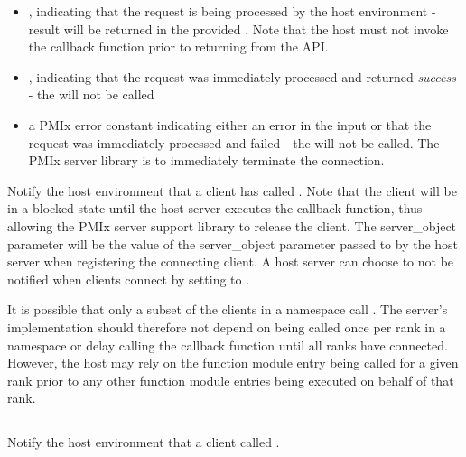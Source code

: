 \begin{itemize}
    \item {}, indicating that the request is being processed by the host environment - result will be returned in the provided . Note that the host must not invoke the callback function prior to returning from the \ac{API}.
    \item {}, indicating that the request was immediately processed and returned \textit{success} - the  will not be called
    \item a PMIx error constant indicating either an error in the input or that the request was immediately processed and failed - the  will not be called. The \ac{PMIx} server library is to immediately terminate the connection.
\end{itemize}

\descr

Notify the host environment that a client has called .
Note that the client will be in a blocked state until the host server executes the callback function, thus allowing the \ac{PMIx} server support library to release
the client.
The server_object parameter will be the value of the server_object parameter passed to
 by the host server when registering the connecting client. A host server can choose to not be notified when clients connect by setting  to .

It is possible that only a subset of the clients in a namespace call
.   The server's 
implementation should therefore not depend on being called once per rank in a
namespace or delay calling the callback function until all ranks have
connected. However, the host may rely on the
function module entry being called for a given rank prior to any other function
module entries being executed on behalf of that rank.

\subsection{}

\summary

Notify the host environment that a client called .

